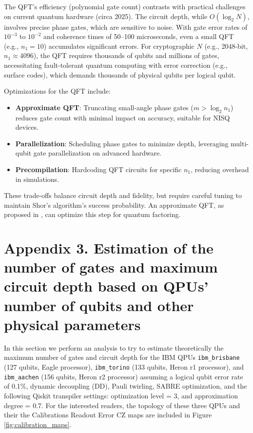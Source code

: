 \documentclass[conference,twoside]{IEEEtran}
\begin{document}
The QFT’s efficiency (polynomial gate count) contrasts with practical challenges on current quantum hardware (circa 2025). The circuit depth, while \( O(\log_2 N) \), involves precise phase gates, which are sensitive to noise. With gate error rates of \( 10^{-3} \) to \( 10^{-2} \) and coherence times of 50–100 microseconds, even a small QFT (e.g., \( n_1 = 10 \)) accumulates significant errors. For cryptographic \( N \) (e.g., 2048-bit, \( n_1 \approx 4096 \)), the QFT requires thousands of qubits and millions of gates, necessitating fault-tolerant quantum computing with error correction (e.g., surface codes), which demands thousands of physical qubits per logical qubit.

Optimizations for the QFT include:
\begin{itemize}
    \item \textbf{Approximate QFT}: Truncating small-angle phase gates (\( m > \log_2 n_1 \)) reduces gate count with minimal impact on accuracy, suitable for NISQ devices.
    \item \textbf{Parallelization}: Scheduling phase gates to minimize depth, leveraging multi-qubit gate parallelization on advanced hardware.
    \item \textbf{Precompilation}: Hardcoding QFT circuits for specific \( n_1 \), reducing overhead in simulations.
\end{itemize}
These trade-offs balance circuit depth and fidelity, but require careful tuning to maintain Shor's algorithm’s success probability. An approximate QFT, as proposed in \citep{coppersmith1994}, can optimize this step for quantum factoring.

\section*{Appendix 3. Estimation of the number of gates and maximum circuit depth based on QPUs' number of qubits and other physical parameters}

In this section we perform an analysis to try to estimate theoretically the maximum number of gates and circuit depth for the IBM QPUs \texttt{ibm\_brisbane} (127 qubits, Eagle processor), \texttt{ibm\_torino} (133 qubits, Heron r1 processor), and \texttt{ibm\_aachen} (156 qubits, Heron r2 processor) assuming a logical qubit error rate of 0.1\%, dynamic decoupling (DD), Pauli twirling, SABRE optimization, and the following Qiskit transpiler settings: optimization level = 3, and approximation degree = 0.7. For the interested readers, the topology of these three QPUs and their the Calibrations Readout Error CZ maps are included in Figure \ref{fig:calibration_maps}.
\end{document}
